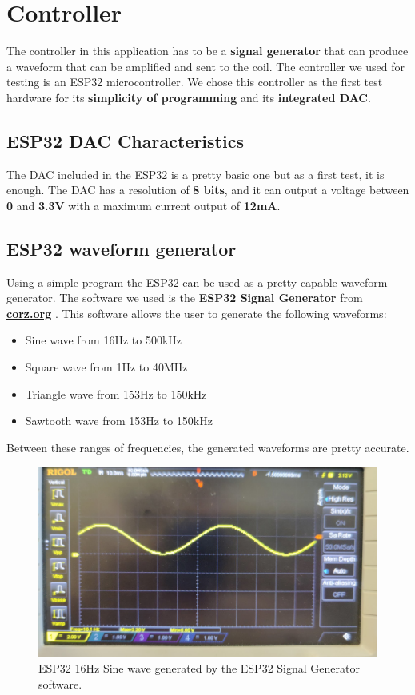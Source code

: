 \section{Controller}
The controller in this application has to be a \textbf{signal generator} that can produce a waveform that can be amplified and sent to the coil.
The controller we used for testing is an ESP32 microcontroller.
We chose this controller as the first test hardware for its \textbf{simplicity of programming} and its \textbf{integrated DAC}.

\subsection{ESP32 DAC Characteristics}
The DAC included in the ESP32 is a pretty basic one but as a first test, it is enough.
The DAC has a resolution of \textbf{8 bits}, and it can output a voltage between \textbf{0} and \textbf{3.3V} with a maximum current output of \textbf{12mA}.

\subsection{ESP32 waveform generator}
Using a simple program the ESP32 can be used as a pretty capable waveform generator.
The software we used is the \textbf{ESP32 Signal Generator} from \textbf{\href{https://corz.org}{corz.org}} \cite{corz_signal_gen}.
This software allows the user to generate the following waveforms:
\begin{itemize}
    \item Sine wave from 16Hz to 500kHz
    \item Square wave from 1Hz to 40MHz
    \item Triangle wave from 153Hz to 150kHz 
    \item Sawtooth wave from 153Hz to 150kHz
\end{itemize}

\begin{samepage}
    Between these ranges of frequencies, the generated waveforms are pretty accurate.
    \nopagebreak

    \begin{figure}[H]
        \centering
        \includegraphics[width=0.9\linewidth]{Chapters/Chapter4/Figures/16Hz_signal_gen.jpg}
        \caption[ESP32 DAC in action]{ESP32 16Hz Sine wave generated by the ESP32 Signal Generator software.}
        \label{fig:16Hz_signal_gen}
    \end{figure}
\end{samepage}

